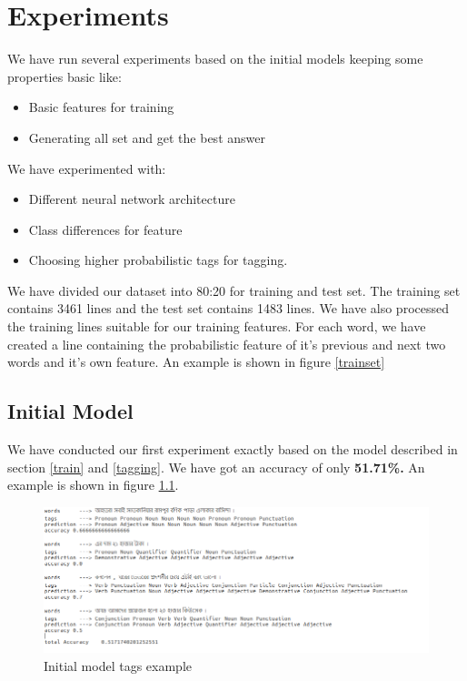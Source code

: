 \documentclass{standalone}
\begin{document}
\chapter{Experiments}
\label{chap:experiments}
We have run several experiments based on the initial models keeping some properties basic like: 
\begin{itemize}
    \item Basic features for training
    \item Generating all set and get the best answer
\end{itemize}

We have experimented with:
\begin{itemize}
    \item Different neural network architecture
    \item Class differences for feature
    \item Choosing higher probabilistic tags for tagging. 
\end{itemize}
We have divided our dataset into 80:20 for training and test set. The training set contains 3461 lines and the test set contains 1483 lines. We have also processed the training lines suitable for our training features. For each word, we have created a line containing the probabilistic feature of it’s previous and next two words and it’s own feature. An example is shown in figure \ref{trainset}

\section{Initial Model}
We have conducted our first experiment exactly based on the model described in section \ref{train} and \ref{tagging}. We have got an accuracy of only \textbf{51.71\%.} An example is shown in figure \ref{exp1}.
 \begin{figure}[h!]
    \centering
    \includegraphics[width=1.0\columnwidth]{img/exp1.png}
    \caption{Initial model tags example}
    \label{exp1}
\end{figure}
\end{document}
